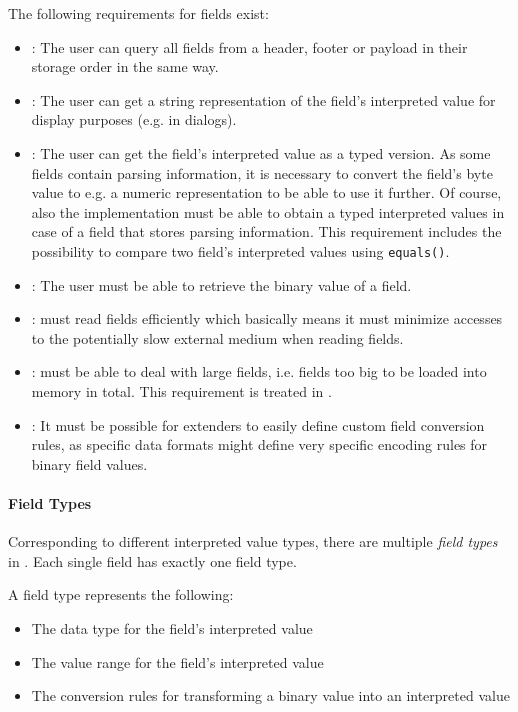 The following requirements for fields exist:
\begin{itemize}
	\item \REQUfieldQueryFields{}: The user can query all fields from a header, footer or payload in their storage order in the same way.
	\item \REQUfieldInterpValueString{}: The user can get a string representation of the field's interpreted value for display purposes (e.g. in dialogs).
	\item \REQUfieldInterpValueTyped{}: The user can get the field's interpreted value as a typed version. As some fields contain parsing information, it is necessary to convert the field's byte value to e.g. a numeric representation to be able to use it further. Of course, also the \LibName{} implementation must be able to obtain a typed interpreted values in case of a field that stores parsing information. This requirement includes the possibility to compare two field's interpreted values using \texttt{equals()}.
	\item \REQUfieldBinaryValue{}: The user must be able to retrieve the binary value of a field.
	\item \REQUfieldEfficientReading{}: \LibName{} must read fields efficiently which basically means it must minimize accesses to the potentially slow external medium when reading fields.
	\item \REQUfieldLargeFields{}: \LibName{} must be able to deal with large fields, i.e. fields too big to be loaded into memory in total. This requirement is treated in .
	\item \REQUfieldCustomConversions{}: It must be possible for \LibName{} extenders to easily define custom field conversion rules, as specific data formats might define very specific encoding rules for binary field values.
\end{itemize}


\paragraph{Field Types}
\label{sec:FieldTypes}

Corresponding to different interpreted value types, there are multiple \emph{field types} in \LibName{}. Each single field has exactly one field type.

A field type represents the following:
\begin{itemize}
	\item The data type for the field's interpreted value
	\item The value range for the field's interpreted value
	\item The conversion rules for transforming a binary value into an interpreted value
\end{itemize}

